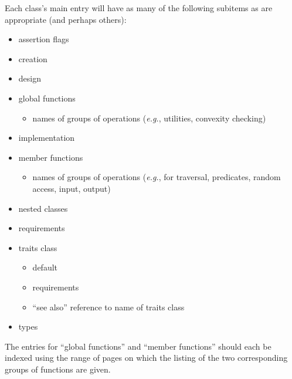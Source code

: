 \documentclass[11pt]{article}
\begin{document}
\begin{description}
       Each class's main entry will have as many of the following subitems as
       are appropriate (and perhaps others):
           \begin{itemize}
              \item assertion flags
              \item creation
              \item design
              \item global functions 
                    \begin{itemize}
                       \item names of groups of operations  ({\em e.g.},
                             utilities, convexity checking)
                    \end{itemize}
              \item implementation
              \item member functions 
                    \begin{itemize}
                       \item names of groups of operations ({\em e.g.},
                             for  traversal,
                             predicates, random access, input, output)
                    \end{itemize}
              \item nested classes
              \item requirements
              \item traits class
                    \begin{itemize}
                       \item default
                       \item requirements
                       \item ``see also'' reference to name of traits class
                    \end{itemize}
             \item types
           \end{itemize}
      The entries for ``global functions'' and ``member functions'' should 
      each be indexed using the range of pages on which the listing of the two 
      corresponding groups of functions are given.


\end{description}
\end{document}
